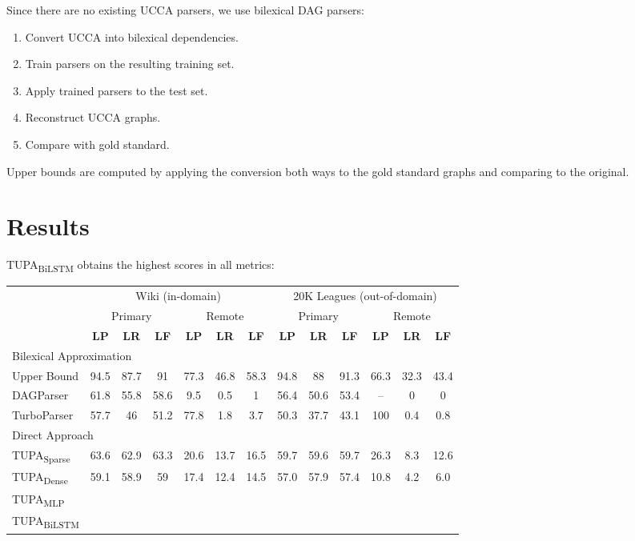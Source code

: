\documentclass[a0,portrait]{a0poster}
\newcommand{\parser}[1]{TUPA\textsubscript{#1}}
\begin{document}
\begin{multicols}{2}
Since there are no existing UCCA parsers, we use bilexical DAG parsers:
\begin{enumerate}
 \item Convert UCCA into bilexical dependencies.
 \item Train parsers on the resulting training set.
 \item Apply trained parsers to the test set.
 \item Reconstruct UCCA graphs.
 \item Compare with gold standard.
\end{enumerate}
Upper bounds are computed by applying
the conversion both ways to the gold standard
graphs and comparing to the original.



\section*{Results}

\parser{BiLSTM} obtains the highest scores in all metrics:
	  
\begin{center}
	\begin{tabular}{l|ccc|ccc||ccc|ccc}
	& \multicolumn{6}{c||}{Wiki (in-domain)} & \multicolumn{6}{c}{20K Leagues (out-of-domain)} \\
	& \multicolumn{3}{c|}{Primary} & \multicolumn{3}{c||}{Remote}
	& \multicolumn{3}{c|}{Primary} & \multicolumn{3}{c}{Remote} \\
	& \textbf{LP} & \textbf{LR} & \textbf{LF} & \textbf{LP} & \textbf{LR} & \textbf{LF}
	& \textbf{LP} & \textbf{LR} & \textbf{LF} & \textbf{LP} & \textbf{LR} & \textbf{LF} \\
	\hline
	\multicolumn{4}{l}{\rule{0pt}{2ex} \footnotesize Bilexical Approximation} \\
	\small Upper Bound
	& \small 94.5 & \small 87.7 & \small 91 & \small 77.3 & \small 46.8 & \small 58.3
	& \small 94.8 & \small 88 & \small 91.3 & \small 66.3 & \small 32.3 & 43.4 \\
	DAGParser \cite{ribeyre-villemontedelaclergerie-seddah:2014:SemEval}
	& 61.8 & 55.8 & 58.6 & 9.5 & 0.5 & 1
	& 56.4 & 50.6 & 53.4 & -- & 0 & 0 \\
	TurboParser \cite{almeida-martins:2015:SemEval}
	& 57.7 & 46 & 51.2 & 77.8 & 1.8 & 3.7
	& 50.3 & 37.7 & 43.1 & 100 & 0.4 & 0.8 \\
	\hline
	\multicolumn{4}{l}{\rule{0pt}{2ex} \footnotesize Direct Approach} \\
	\parser{Sparse}
	& 63.6 & 62.9 & 63.3 & 20.6 & 13.7 & 16.5
	& 59.7 & 59.6 & 59.7 & 26.3 & 8.3 & 12.6 \\
	\parser{Dense} 
	& 59.1 & 58.9 & 59 & 17.4 & 12.4 & 14.5
	& 57.0 & 57.9 & 57.4 & 10.8 & 4.2 & 6.0 \\
	\parser{MLP}
	&  \\
	\parser{BiLSTM}
	&
	\end{tabular}
\end{center}


\end{multicols}
\end{document}
